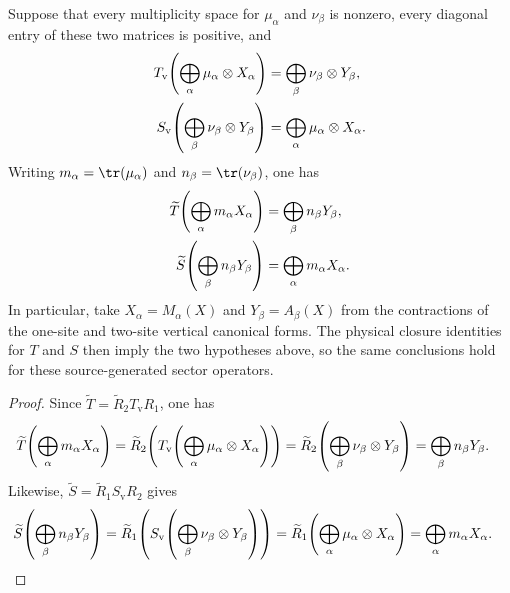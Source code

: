 \begin{lemma}
    \label{thm:mpdo_transported_vertical_sector_maps}
    \leanok
    Suppose that every multiplicity space for $\mu_\alpha$ and $\nu_\beta$
    is nonzero, every diagonal entry of these two matrices is positive, and
    \begin{align}
        T_{\mathrm v}\!\left(\bigoplus_\alpha\mu_\alpha\otimes X_\alpha\right)
         & =\bigoplus_\beta\nu_\beta\otimes Y_\beta,
        \notag                                          \\
        S_{\mathrm v}\!\left(\bigoplus_\beta\nu_\beta\otimes Y_\beta\right)
         & =\bigoplus_\alpha\mu_\alpha\otimes X_\alpha.
        \notag
    \end{align}
    Writing $m_\alpha=\tr(\mu_\alpha)$ and
    $n_\beta=\tr(\nu_\beta)$, one has
    \begin{align}
        \widetilde T\!\left(\bigoplus_\alpha m_\alpha X_\alpha\right)
         & =\bigoplus_\beta n_\beta Y_\beta,
        \notag                                  \\
        \widetilde S\!\left(\bigoplus_\beta n_\beta Y_\beta\right)
         & =\bigoplus_\alpha m_\alpha X_\alpha.
        \notag
    \end{align}
    In particular, take $X_\alpha=M_\alpha(X)$ and
    $Y_\beta=A_\beta(X)$ from the contractions of the one-site and two-site
    vertical canonical forms. The physical closure identities for $T$ and
    $S$ then imply the two hypotheses above, so the same conclusions hold for
    these source-generated sector operators.
\end{lemma}

\begin{proof}\leanok
    Since $\widetilde T=\widetilde R_2T_{\mathrm v}R_1$, one has
    \begin{align}
        \widetilde T\!\left(\bigoplus_\alpha m_\alpha X_\alpha\right)
         & =\widetilde R_2\!\left(T_{\mathrm v}\!\left(\bigoplus_\alpha\mu_\alpha\otimes X_\alpha\right)\right)
        =\widetilde R_2\!\left(\bigoplus_\beta\nu_\beta\otimes Y_\beta\right)
        =\bigoplus_\beta n_\beta Y_\beta.
        \notag
    \end{align}
    Likewise, $\widetilde S=\widetilde R_1S_{\mathrm v}R_2$ gives
    \begin{align}
        \widetilde S\!\left(\bigoplus_\beta n_\beta Y_\beta\right)
         & =\widetilde R_1\!\left(S_{\mathrm v}\!\left(\bigoplus_\beta\nu_\beta\otimes Y_\beta\right)\right)
        =\widetilde R_1\!\left(\bigoplus_\alpha\mu_\alpha\otimes X_\alpha\right)
        =\bigoplus_\alpha m_\alpha X_\alpha.
        \notag
    \end{align}
\end{proof}

